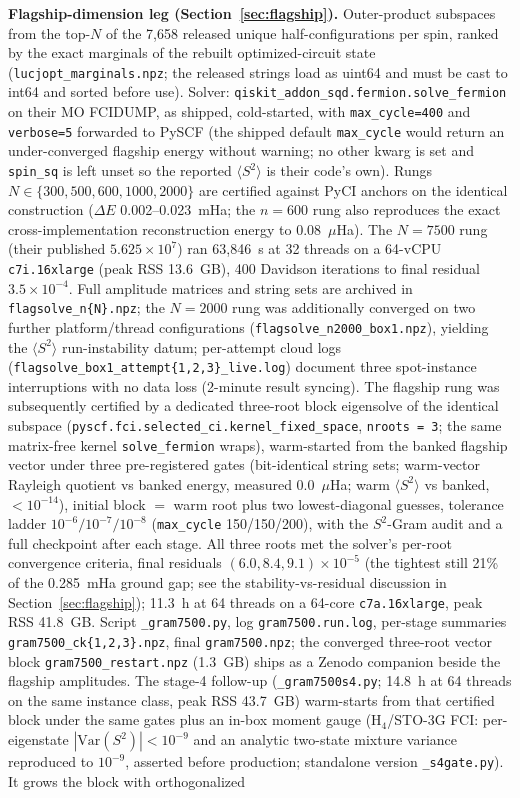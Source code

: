 \documentclass[11pt]{article}
\newcommand{\ssq}{\ensuremath{\langle S^2\rangle}}
\begin{document}
\textbf{Flagship-dimension leg (Section~\ref{sec:flagship}).} Outer-product subspaces from the top-$N$ of the 7{,}658 released unique half-configurations per spin, ranked by the exact marginals of the rebuilt optimized-circuit state (\texttt{lucjopt\_marginals.npz}; the released strings load as uint64 and must be cast to int64 and sorted before use). Solver: \texttt{qiskit\_addon\_sqd.fermion.solve\_fermion} on their MO FCIDUMP, as shipped, cold-started, with \texttt{max\_cycle=400} and \texttt{verbose=5} forwarded to PySCF (the shipped default \texttt{max\_cycle} would return an under-converged flagship energy without warning; no other kwarg is set and \texttt{spin\_sq} is left unset so the reported \ssq{} is their code's own). Rungs $N \in \{300, 500, 600, 1000, 2000\}$ are certified against PyCI anchors on the identical construction ($\Delta E$ 0.002--0.023~mHa; the $n=600$ rung also reproduces the exact cross-implementation reconstruction energy to 0.08~$\mu$Ha). The $N=7500$ rung (their published $5.625\times10^7$) ran 63{,}846~s at 32 threads on a 64-vCPU \texttt{c7i.16xlarge} (peak RSS 13.6~GB), 400 Davidson iterations to final residual $3.5\times10^{-4}$. Full amplitude matrices and string sets are archived in \texttt{flagsolve\_n\{N\}.npz}; the $N=2000$ rung was additionally converged on two further platform/thread configurations (\texttt{flagsolve\_n2000\_box1.npz}), yielding the \ssq{} run-instability datum; per-attempt cloud logs (\texttt{flagsolve\_box1\_attempt\{1,2,3\}\_live.log}) document three spot-instance interruptions with no data loss (2-minute result syncing). The flagship rung was subsequently certified by a dedicated three-root block eigensolve of the identical subspace (\texttt{pyscf.fci.selected\_ci.kernel\_fixed\_space}, \texttt{nroots = 3}; the same matrix-free kernel \texttt{solve\_fermion} wraps), warm-started from the banked flagship vector under three pre-registered gates (bit-identical string sets; warm-vector Rayleigh quotient vs banked energy, measured 0.0~$\mu$Ha; warm \ssq{} vs banked, $<10^{-14}$), initial block $=$ warm root plus two lowest-diagonal guesses, tolerance ladder $10^{-6}/10^{-7}/10^{-8}$ (\texttt{max\_cycle} 150/150/200), with the $S^2$-Gram audit and a full checkpoint after each stage. All three roots met the solver's per-root convergence criteria, final residuals $(6.0, 8.4, 9.1)\times10^{-5}$ (the tightest still 21\% of the 0.285~mHa ground gap; see the stability-vs-residual discussion in Section~\ref{sec:flagship}); 11.3~h at 64 threads on a 64-core \texttt{c7a.16xlarge}, peak RSS 41.8~GB. Script \texttt{\_gram7500.py}, log \texttt{gram7500.run.log}, per-stage summaries \texttt{gram7500\_ck\{1,2,3\}.npz}, final \texttt{gram7500.npz}; the converged three-root vector block \texttt{gram7500\_restart.npz} (1.3~GB) ships as a Zenodo companion beside the flagship amplitudes. The stage-4 follow-up (\texttt{\_gram7500s4.py}; 14.8~h at 64 threads on the same instance class, peak RSS 43.7~GB) warm-starts from that certified block under the same gates plus an in-box moment gauge (H$_4$/STO-3G FCI: per-eigenstate $|\mathrm{Var}(S^2)| < 10^{-9}$ and an analytic two-state mixture variance reproduced to $10^{-9}$, asserted before production; standalone version \texttt{\_s4gate.py}). It grows the block with orthogonalized 
\end{document}
